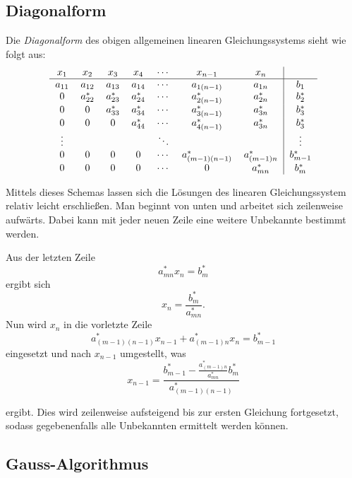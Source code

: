 		\subsection{Diagonalform}
		
			Die \emph{Diagonalform} des obigen allgemeinen linearen Gleichungssystems sieht wie folgt aus:
			\[
				\begin{tabular} {ccccccc|c}
					$x_1$ & $x_2$ & $x_3$ & $x_4$ & $\cdots$ & $x_{n-1}$ & $x_n$ &\\
					\hline
					$a_{11}$ & $a_{12}$ & $a_{13}$ & $a_{14}$ & $\cdots$ & $a_{1(n-1)}$ & $a_{1n}$ & $b_{1}$\\
					0 & $a_{22}^*$ & $a_{23}^*$ & $a_{24}^*$ & $\cdots$ & $a_{2(n-1)}^*$ & $a_{2n}^*$ & $b_{2}^*$\\
					0 & 0 & $a_{33}^*$ & $a_{34}^*$ & $\cdots$ & $a_{3(n-1)}^*$ & $a_{3n}^*$ & $b_{3}^*$\\
					0 & 0 & 0 & $a_{44}^*$ & $\cdots$ & $a_{4(n-1)}^*$ & $a_{3n}^*$ & $b_{3}^*$\\
					$\vdots$ & & & & $\ddots$ & & & $\vdots$\\
					0 & 0 & 0 & 0 & $\cdots$ & $a_{(m-1)(n-1)}^*$ & $a_{(m-1)n}^*$ & $b_{m-1}^*$\\
					0 & 0 & 0 & 0 & $\cdots$ & 0 & $a_{mn}^*$ & $b_{m}^*$\\
				\end{tabular}
			\]
			
			\noindent Mittels dieses Schemas lassen sich die L\"osungen des linearen Gleichungssystem relativ leicht erschlie\ss en.
			Man beginnt von unten und arbeitet sich zeilenweise aufw\"arts.
			Dabei kann mit jeder neuen Zeile eine weitere Unbekannte bestimmt werden.
			
			\noindent Aus der letzten Zeile
			\[
				a_{mn}^* x_n = b_{m}^*
			\]
			ergibt sich
			\[
				x_n = \frac {b_m^*} {a_{mn}^*}.
			\]
			Nun wird $x_n$ in die vorletzte Zeile
			\[
				a_{(m-1)(n-1)}^* x_{n-1} + a_{(m-1)n}^* x_n = b_{m-1}^*
			\]
			eingesetzt und nach $x_{n-1}$ umgestellt, was
            \[
				x_{n-1} = \frac {b_{m-1}^* -  \frac {a_{(m-1)n}^*} {a_{mn}^*} b_m^*} {a_{(m-1)(n-1)}^*}
			\]
			
			\noindent ergibt.
			Dies wird zeilenweise aufsteigend bis zur ersten Gleichung fortgesetzt,
			sodass gegebenenfalls alle Unbekannten ermittelt werden k\"onnen.
			
		\subsection{Gauss-Algorithmus}
		
